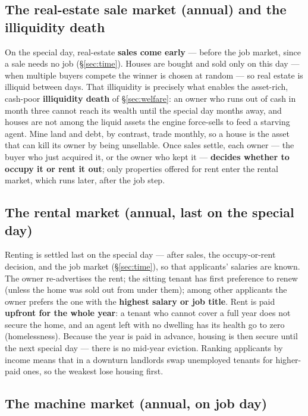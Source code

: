 \documentclass[11pt]{article}
\begin{document}
\subsection{The real-estate sale market (annual) and the illiquidity death}
\label{sec:realestate-sale}

On the special day, real-estate \textbf{sales come early} --- before the job
market, since a sale needs no job (\S\ref{sec:time}). Houses are bought and sold
only on this day --- when multiple buyers compete the winner is chosen at random
--- so real estate is illiquid between days. That illiquidity is precisely what
enables the asset-rich, cash-poor \textbf{illiquidity death} of
\S\ref{sec:welfare}: an owner who runs out of cash in month three cannot reach
its wealth until the special day months away, and houses are not among the liquid
assets the engine force-sells to feed a starving agent. Mine land and debt, by
contrast, trade monthly, so a house is the asset that can kill its owner by being
unsellable. Once sales settle, each owner --- the buyer who just acquired it, or
the owner who kept it --- \textbf{decides whether to occupy it or rent it out};
only properties offered for rent enter the rental market, which runs later, after
the job step.

\subsection{The rental market (annual, last on the special day)}
\label{sec:rental}

Renting is settled last on the special day --- after sales, the occupy-or-rent
decision, and the job market (\S\ref{sec:time}), so that applicants' salaries are
known. The owner re-advertises the rent; the sitting tenant has first preference
to renew (unless the home was sold out from under them); among other applicants
the owner prefers the one with the \textbf{highest salary or job title}. Rent is
paid \textbf{upfront for the whole year}: a tenant who cannot cover a full year
does not secure the home, and an agent left with no dwelling has its health go to
zero (homelessness). Because the year is paid in advance, housing is then secure
until the next special day --- there is no mid-year eviction. Ranking applicants
by income means that in a downturn landlords swap unemployed tenants for
higher-paid ones, so the weakest lose housing first.

\subsection{The machine market (annual, on job day)}
\end{document}
